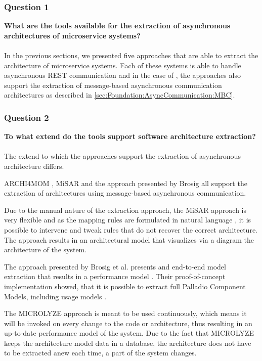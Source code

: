 \subsubsection{Question 1}
\textbf{What are the tools available for the extraction of asynchronous architectures of microservice systems?}
\\ \\
In the previous sections, we presented five approaches that are able to extract the architecture of microservice systems.
Each of these systems is able to handle asynchronous REST communication and in the case of \cite{Singh2022ARCHI4MOM,Alshuqayran2018MiSAR,Brosig2011}, the approaches also support the extraction of message-based asynchronous communication architectures as described in \autoref{sec:Foundation:AsyncCommunication:MBC}.

\subsubsection{Question 2}
\textbf{To what extend do the tools support software architecture extraction?}
\\ \\
The extend to which the approaches support the extraction of asynchronous architecture differs.

ARCHI4MOM \cite{Singh2022ARCHI4MOM}, MiSAR \cite{Alshuqayran2018MiSAR} and the approach presented by Brosig \cite{Brosig2011} all support the extraction of architectures using message-based asynchronous communication.

Due to the manual nature of the extraction approach, the MiSAR approach is very flexible and as the mapping rules are formulated in natural language \cite{Alshuqayran2020Thesis}, it is possible to intervene and tweak rules that do not recover the correct architecture.
The approach results in an architectural model that visualizes via a diagram the architecture of the system.

The approach presented by Brosig et al. presents and end-to-end model extraction that results in a performance model \cite{Brosig2011}.
Their proof-of-concept implementation showed, that it is possible to extract full Palladio Component Models, including usage models \cite{Brosig2011}.

The MICROLYZE approach is meant to be used continuously, which means it will be invoked on every change to the code or architecture, thus resulting in an up-to-date performance model of the system.
Due to the fact that MICROLYZE keeps the architecture model data in a database, the architecture does not have to be extracted anew each time, a part of the system changes.

